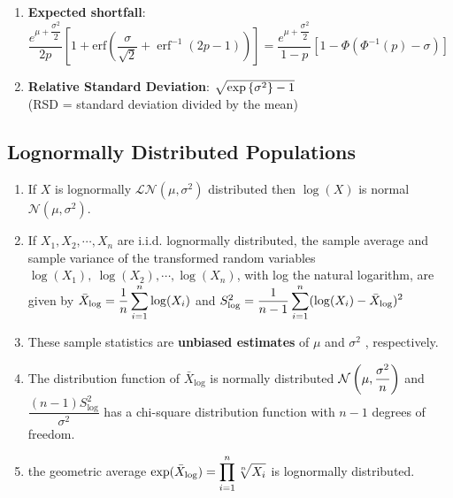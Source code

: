 \begin{enumerate}
    \item \textbf{Expected shortfall}:
    $
        {\displaystyle {{\dfrac {e^{\mu +{\dfrac {\sigma ^{2}}{2}}}}{2p}}\left[1+\text{erf} \left({\dfrac {\sigma }{\sqrt {2}}}+\operatorname {erf} ^{-1}(2p-1)\right)\right]
        ={\dfrac {e^{\mu +{\dfrac {\sigma ^{2}}{2}}}}{1-p}}\left[1-\Phi (\Phi ^{-1}(p)-\sigma )\right]}}
    $
    \hfill \cite{wiki/Log-normal_distribution}

    \item \textbf{Relative Standard Deviation}: $\sqrt{\exp\left\{\sigma^2\right\} - 1}$
    \hfill \cite{statistics/book/Statistics-for-Data-Scientists/Maurits-Kaptein}
    \\
    (RSD = standard deviation divided by the mean)
    \hfill \cite{statistics/book/Statistics-for-Data-Scientists/Maurits-Kaptein}
\end{enumerate}





\subsection{Lognormally Distributed Populations}

\begin{enumerate}
    \item If $X$ is lognormally $\mathcal{L N} (\mu, \sigma^2)$ distributed then $\log(X)$ is normal $\mathcal{N} (\mu, \sigma^2)$.
    \hfill \cite{statistics/book/Statistics-for-Data-Scientists/Maurits-Kaptein}

    \item If $X_1 , X_2, \cdots , X _n$ are i.i.d. lognormally distributed, the sample average and sample variance of the transformed random variables $\log (X_1),\ \log (X_2) , \cdots , \log (X_ n )$, with log the natural logarithm, are given by
    $
        \bar{X}_{\log} = \dfrac{1}{n} \displaystyle\sum^n _{i=1} \log (X _i )
    $
    and
    $
        S^2 _{\log} = \dfrac{1 }{n - 1} \displaystyle\sum^n _{i=1} (\log (X _i ) - \bar{X}_{\log} )^2
    $
    \hfill \cite{statistics/book/Statistics-for-Data-Scientists/Maurits-Kaptein}

    \item These sample statistics are \textbf{unbiased estimates} of $\mu$ and $\sigma^ 2$ , respectively.
    \hfill \cite{statistics/book/Statistics-for-Data-Scientists/Maurits-Kaptein}

    \item The distribution function of $\bar{X}_{\log}$ is normally distributed $\mathcal{N} \left(\mu, \dfrac{\sigma ^ 2}{n}\right)$ and $\dfrac{(n - 1) S^2 _{\log}}{\sigma ^ 2}$ has a chi-square distribution function with $n - 1$ degrees of freedom.
    \hfill \cite{statistics/book/Statistics-for-Data-Scientists/Maurits-Kaptein}

    \item the geometric average $\exp ( \bar{X}_{\log} ) = \displaystyle\prod ^n _{i=1} \sqrt[n]{{X}_ i}$ is lognormally distributed.
    \hfill \cite{statistics/book/Statistics-for-Data-Scientists/Maurits-Kaptein}
\end{enumerate}





